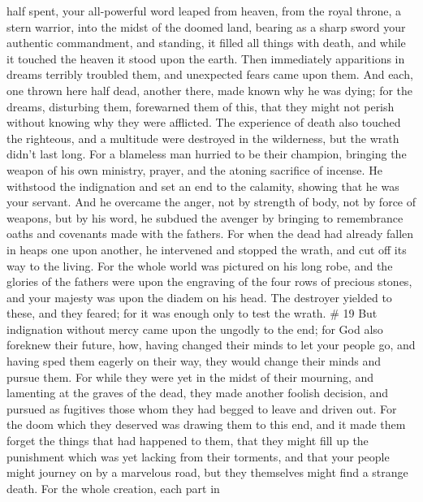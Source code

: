 half spent,  your all-powerful word leaped from heaven,
from the royal throne, a stern warrior, into the midst of the doomed
land,  bearing as a sharp sword your authentic commandment,
and standing, it filled all things with death, and while it touched the
heaven it stood upon the earth.  Then immediately
apparitions in dreams terribly troubled them, and unexpected fears came
upon them.  And each, one thrown here half dead, another
there, made known why he was dying;  for the dreams,
disturbing them, forewarned them of this, that they might not perish
without knowing why they were afflicted.  The experience of
death also touched the righteous, and a multitude were destroyed in the
wilderness, but the wrath didn't last long.  For a
blameless man hurried to be their champion, bringing the weapon of his
own ministry, prayer, and the atoning sacrifice of incense. He withstood
the indignation and set an end to the calamity, showing that he was your
servant.  And he overcame the anger, not by strength of
body, not by force of weapons, but by his word, he subdued the avenger
by bringing to remembrance oaths and covenants made with the fathers.
 For when the dead had already fallen in heaps one upon
another, he intervened and stopped the wrath, and cut off its way to the
living.  For the whole world was pictured on his long robe,
and the glories of the fathers were upon the engraving of the four rows
of precious stones, and your majesty was upon the diadem on his head.
 The destroyer yielded to these, and they feared; for it
was enough only to test the wrath. \# 19  But indignation
without mercy came upon the ungodly to the end; for God also foreknew
their future,  how, having changed their minds to let your
people go, and having sped them eagerly on their way, they would change
their minds and pursue them.  For while they were yet in the
midst of their mourning, and lamenting at the graves of the dead, they
made another foolish decision, and pursued as fugitives those whom they
had begged to leave and driven out.  For the doom which they
deserved was drawing them to this end, and it made them forget the
things that had happened to them, that they might fill up the punishment
which was yet lacking from their torments,  and that your
people might journey on by a marvelous road, but they themselves might
find a strange death.  For the whole creation, each part in
